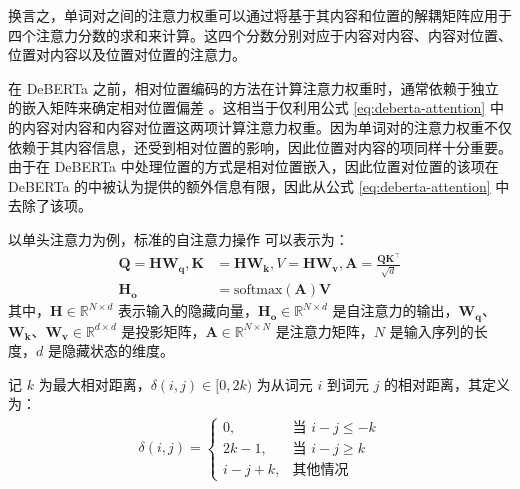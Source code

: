 换言之，单词对之间的注意力权重可以通过将基于其内容和位置的解耦矩阵应用于四个注意力分数的求和来计算。这四个分数分别对应于内容对内容、内容对位置、位置对内容以及位置对位置的注意力。

在 DeBERTa 之前，相对位置编码的方法在计算注意力权重时，通常依赖于独立的嵌入矩阵来确定相对位置偏差 \cite{Shaw2018SelfAttentionWR, Huang2018MusicTG}。这相当于仅利用公式 \ref{eq:deberta-attention} 中的内容对内容和内容对位置这两项计算注意力权重。因为单词对的注意力权重不仅依赖于其内容信息，还受到相对位置的影响，因此位置对内容的项同样十分重要。由于在 DeBERTa 中处理位置的方式是相对位置嵌入，因此位置对位置的该项在 DeBERTa 的中被认为提供的额外信息有限，因此从公式 \ref{eq:deberta-attention} 中去除了该项。

以单头注意力为例，标准的自注意力操作 \cite{transformer} 可以表示为：
\begin{align}
\mathbf{Q} = \mathbf{HW_{q}}, \mathbf{K} &= \mathbf{HW_{k}}, V = \mathbf{HW_{v}}, \mathbf{A} = \frac{\mathbf{QK}^{\intercal}}{\sqrt{d}} \\
\mathbf{H_{o}} &= \text{softmax}(\mathbf{A})\mathbf{V}
\label{eq:transformer-attention1}
\end{align}
其中，$\mathbf{H} \in \mathbb{R}^{N×d}$ 表示输入的隐藏向量，$\mathbf{H_{o}} \in \mathbb{R}^{N×d}$ 是自注意力的输出，$\mathbf{W_{q}}$、$\mathbf{W_{k}}$、$\mathbf{W_{v}} \in \mathbb{R}^{d×d}$ 是投影矩阵，$\mathbf{A} \in \mathbb{R}^{N×N}$ 是注意力矩阵，$N$ 是输入序列的长度，$d$ 是隐藏状态的维度。

记 $k$ 为最大相对距离，$\delta(i, j) \in [0, 2k)$ 为从词元 $i$ 到词元 $j$ 的相对距离，其定义为：
\begin{align}
\delta(i, j)=\begin{cases}
0, & \text{当~} i - j \leq -k \\
2k - 1, & \text{当~} i - j \geq k \\
i - j + k, & \text{其他情况}
\end{cases}
\label{eq:deberta-distance}
\end{align}

